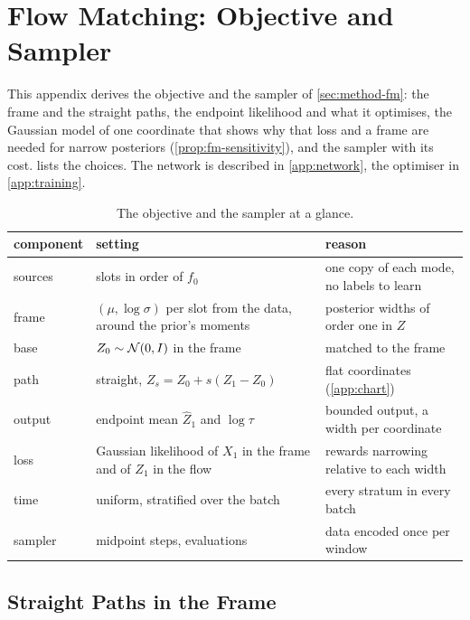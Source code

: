 \section{Flow Matching: Objective and Sampler}
\label{app:fm}

This appendix derives the objective and the sampler of \cref{sec:method-fm}: the frame and the
straight paths, the endpoint likelihood and what it optimises, the Gaussian model of one coordinate
that shows why that loss and a frame are needed for narrow posteriors
(\cref{prop:fm-sensitivity}), and the sampler with its cost.  lists the choices.
The network is described in \cref{app:network}, the optimiser in \cref{app:training}.

\begin{table}[t]
  \centering
  \caption{The objective and the sampler at a glance.}
  \label{tab:fm-recipe}
  \small
  \begin{tabular}{@{}lll@{}}
    \toprule
    component & setting & reason \\
    \midrule
    sources & slots in order of $f_0$ & one copy of each mode, no labels to learn \\
    frame & $(\mu,\log\sigma)$ per slot from the data, around the prior's moments & posterior widths of order one in $Z$ \\
    base & $Z_0\sim\mathcal{N}(0,I)$ in the frame & matched to the frame \\
    path & straight, $Z_s = Z_0 + s(Z_1 - Z_0)$ & flat coordinates (\cref{app:chart}) \\
    output & endpoint mean $\hat Z_1$ and $\log\tau$ & bounded output, a width per coordinate \\
    loss & Gaussian likelihood of $X_1$ in the frame and of $Z_1$ in the flow & rewards narrowing relative to each width \\
    time & uniform, stratified over the batch & every stratum in every batch \\
    sampler & \FlowMatchingOdeSteps{} midpoint steps, \FlowMatchingEvaluations{} evaluations & data encoded once per window \\
    \bottomrule
  \end{tabular}
\end{table}

\subsection{Straight Paths in the Frame}
\label{app:fm-paths}

